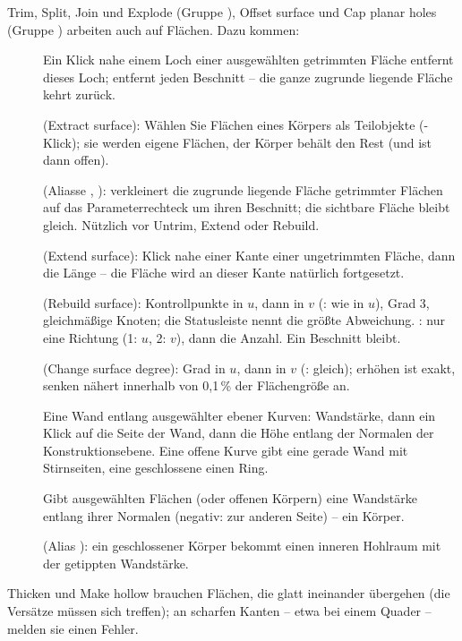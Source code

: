 Trim, Split, Join und Explode (Gruppe ), Offset surface und Cap planar holes (Gruppe
) arbeiten auch auf Flächen. Dazu kommen:
\begin{description}
\item[] Ein Klick nahe einem Loch einer ausgewählten getrimmten Fläche entfernt dieses
  Loch;  entfernt jeden Beschnitt -- die ganze zugrunde liegende Fläche kehrt zurück.
\item[] (Extract surface): Wählen Sie Flächen eines Körpers als Teilobjekte
  (-Klick); sie werden eigene Flächen, der Körper behält den Rest (und ist dann
  offen).
\item[] (Aliasse , ): verkleinert die
  zugrunde liegende Fläche getrimmter Flächen auf das Parameterrechteck um ihren Beschnitt; die
  sichtbare Fläche bleibt gleich. Nützlich vor Untrim, Extend oder Rebuild.
\item[] (Extend surface): Klick nahe einer Kante einer ungetrimmten Fläche, dann
  die Länge -- die Fläche wird an dieser Kante natürlich fortgesetzt.
\item[] (Rebuild surface): Kontrollpunkte in $u$, dann in $v$ (: wie
  in $u$), Grad 3, gleichmäßige Knoten; die Statusleiste nennt die größte Abweichung.
  : nur eine Richtung (1: $u$, 2: $v$), dann die Anzahl. Ein Beschnitt bleibt.
\item[] (Change surface degree): Grad in $u$, dann in $v$ (:
  gleich); erhöhen ist exakt, senken nähert innerhalb von 0,1\,\% der Flächengröße an.
\item[] Eine Wand entlang ausgewählter ebener Kurven: Wandstärke, dann ein Klick auf die
  Seite der Wand, dann die Höhe entlang der Normalen der Konstruktionsebene. Eine offene Kurve gibt
  eine gerade Wand mit Stirnseiten, eine geschlossene einen Ring.
\item[] Gibt ausgewählten Flächen (oder offenen Körpern) eine Wandstärke entlang ihrer
  Normalen (negativ: zur anderen Seite) -- ein Körper.
\item[] (Alias ): ein geschlossener Körper bekommt einen inneren
  Hohlraum mit der getippten Wandstärke.
\end{description}
Thicken und Make hollow brauchen Flächen, die glatt ineinander übergehen (die Versätze müssen sich
treffen); an scharfen Kanten -- etwa bei einem Quader -- melden sie einen Fehler.

